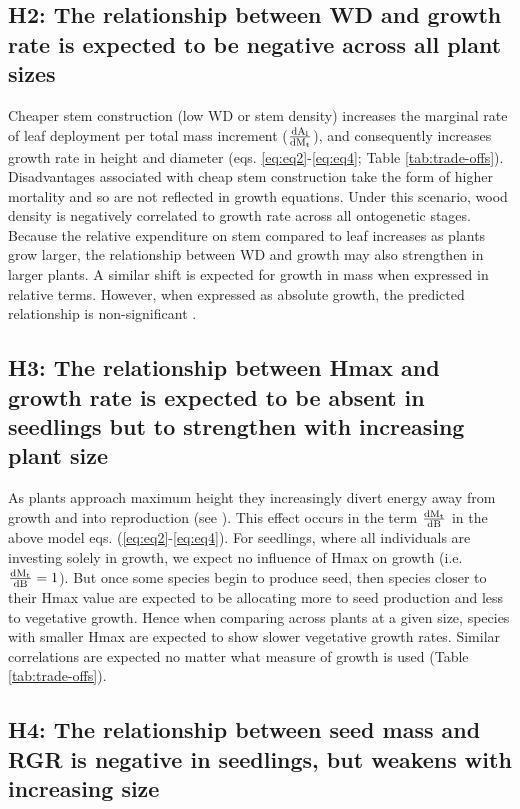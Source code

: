 \documentclass[a4paper,11pt]{article}
\begin{document}
\subsection*{H2: The relationship between WD and growth rate is expected to be negative across all plant sizes}

Cheaper stem construction (low WD or stem density) increases the marginal rate of leaf deployment per total mass increment ($\frac{\rm{d} A_{\rm l}}{\rm{d} M_{\rm t}}$), and consequently increases growth rate in height and diameter (eqs. \ref{eq:eq2}-\ref{eq:eq4}; Table \ref{tab:trade-offs}). Disadvantages associated with cheap stem construction take the form of higher mortality and so are not reflected in growth equations. Under this scenario, wood density is negatively correlated to growth rate across all ontogenetic stages. Because the relative expenditure on stem compared to leaf increases as plants grow larger, the relationship between WD and growth may also strengthen in larger plants. A similar shift is expected for growth in mass when expressed in relative terms. However, when expressed as absolute growth, the predicted relationship is non-significant \citep[see also][]{Enquist-1999}.

\subsection*{H3: The relationship between Hmax and growth rate is expected to be absent in seedlings but to strengthen with increasing plant size}

As plants approach maximum height they increasingly divert energy away from growth and into reproduction (see \citealt{Thomas:1996do,Thomas-2011, Wenk:2015jz}). This effect occurs in the term $\frac{\rm{d} M_{\rm t}}{\rm{d} B}$ in the above model eqs. (\ref{eq:eq2}-\ref{eq:eq4}). For seedlings, where all individuals are investing solely in growth, we expect no influence of Hmax on growth (i.e. $\frac{\rm{d} M_{\rm t}}{\rm{d} B} =1$). But once some species begin to produce seed, then species closer to their Hmax value are expected to be allocating more to seed production and less to vegetative growth. Hence when comparing across plants at a given size, species with smaller Hmax are expected to show slower vegetative growth rates. Similar correlations are expected no matter what measure of  growth is used (Table \ref{tab:trade-offs}).

\subsection*{H4: The relationship between seed mass and RGR is negative in seedlings, but weakens with increasing size}
\end{document}

